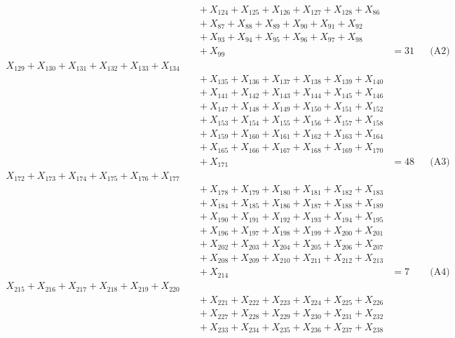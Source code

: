\documentclass[a4paper,10pt]{article}
\begin{document}
{\begin{align}
&\quad  + X_{124} + X_{125} + X_{126} + X_{127} + X_{128} + X_{86} \\[0.5ex]
&\quad  + X_{87} + X_{88} + X_{89} + X_{90} + X_{91} + X_{92} \\[0.5ex]
&\quad  + X_{93} + X_{94} + X_{95} + X_{96} + X_{97} + X_{98} \\[0.5ex]
&\quad  + X_{99} &= 31 && \text{(A2)} \\
X_{129} + X_{130} + X_{131} + X_{132} + X_{133} + X_{134} \\[0.5ex]
&\quad  + X_{135} + X_{136} + X_{137} + X_{138} + X_{139} + X_{140} \\[0.5ex]
&\quad  + X_{141} + X_{142} + X_{143} + X_{144} + X_{145} + X_{146} \\[0.5ex]
&\quad  + X_{147} + X_{148} + X_{149} + X_{150} + X_{151} + X_{152} \\[0.5ex]
&\quad  + X_{153} + X_{154} + X_{155} + X_{156} + X_{157} + X_{158} \\[0.5ex]
&\quad  + X_{159} + X_{160} + X_{161} + X_{162} + X_{163} + X_{164} \\[0.5ex]
&\quad  + X_{165} + X_{166} + X_{167} + X_{168} + X_{169} + X_{170} \\[0.5ex]
&\quad  + X_{171} &= 48 && \text{(A3)} \\
X_{172} + X_{173} + X_{174} + X_{175} + X_{176} + X_{177} \\[0.5ex]
&\quad  + X_{178} + X_{179} + X_{180} + X_{181} + X_{182} + X_{183} \\[0.5ex]
&\quad  + X_{184} + X_{185} + X_{186} + X_{187} + X_{188} + X_{189} \\[0.5ex]
&\quad  + X_{190} + X_{191} + X_{192} + X_{193} + X_{194} + X_{195} \\[0.5ex]
&\quad  + X_{196} + X_{197} + X_{198} + X_{199} + X_{200} + X_{201} \\[0.5ex]
&\quad  + X_{202} + X_{203} + X_{204} + X_{205} + X_{206} + X_{207} \\[0.5ex]
&\quad  + X_{208} + X_{209} + X_{210} + X_{211} + X_{212} + X_{213} \\[0.5ex]
&\quad  + X_{214} &= 7 && \text{(A4)} \\
X_{215} + X_{216} + X_{217} + X_{218} + X_{219} + X_{220} \\[0.5ex]
&\quad  + X_{221} + X_{222} + X_{223} + X_{224} + X_{225} + X_{226} \\[0.5ex]
&\quad  + X_{227} + X_{228} + X_{229} + X_{230} + X_{231} + X_{232} \\[0.5ex]
&\quad  + X_{233} + X_{234} + X_{235} + X_{236} + X_{237} + X_{238} \\[0.5ex]

\end{align}}
\end{document}
